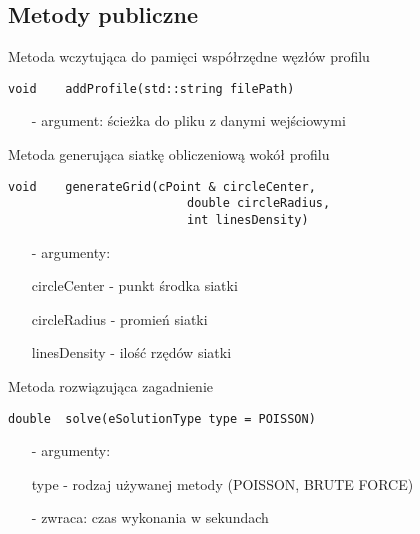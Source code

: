 \subsection{Metody publiczne}
\noindent Metoda wczytująca do pamięci współrzędne węzłów profilu
\begin{lstlisting}[style = nonumbers]
	void	addProfile(std::string filePath)
\end{lstlisting}
\vspace*{-.5cm}
\begin{enumerate} \itemsep1pt \parskip0pt 
	\item[-] \textsf{argument:} ścieżka do pliku z danymi wejściowymi\newline	
\end{enumerate}

\noindent Metoda generująca siatkę obliczeniową wokół profilu
\begin{lstlisting}[style = nonumbers]
	void	generateGrid(cPoint & circleCenter,
						 double circleRadius,
						 int linesDensity)
\end{lstlisting}
\vspace*{-.5cm}
\begin{enumerate} \itemsep1pt \parskip0pt 
	\item[-] \textsf{argumenty:} 
	\item[] circleCenter - punkt środka siatki
	\item[] circleRadius - promień siatki
	\item[] linesDensity - ilość rzędów siatki\newline		
\end{enumerate}

\noindent Metoda rozwiązująca zagadnienie
\begin{lstlisting}[style = nonumbers]
	double	solve(eSolutionType type = POISSON)	
\end{lstlisting}
\vspace*{-.5cm}
\begin{enumerate} \itemsep1pt \parskip0pt 
	\item[-] \textsf{argumenty:}
	\item[] type - rodzaj używanej metody (POISSON, BRUTE FORCE)
	\item[-] \textsf{zwraca:} czas wykonania w sekundach\newline	
\end{enumerate} 


